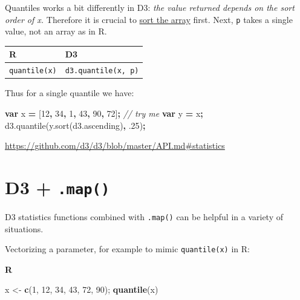 \documentclass[openany]{book}
\newenvironment{Shaded}{\begin{snugshade}}{\end{snugshade}}
\newcommand{\AttributeTok}[1]{\textcolor[rgb]{0.77,0.63,0.00}{#1}}
\newcommand{\CommentTok}[1]{\textcolor[rgb]{0.56,0.35,0.01}{\textit{#1}}}
\newcommand{\DecValTok}[1]{\textcolor[rgb]{0.00,0.00,0.81}{#1}}
\newcommand{\FloatTok}[1]{\textcolor[rgb]{0.00,0.00,0.81}{#1}}
\newcommand{\KeywordTok}[1]{\textcolor[rgb]{0.13,0.29,0.53}{\textbf{#1}}}
\newcommand{\NormalTok}[1]{#1}
\newcommand{\OperatorTok}[1]{\textcolor[rgb]{0.81,0.36,0.00}{\textbf{#1}}}
\newcommand{\StringTok}[1]{\textcolor[rgb]{0.31,0.60,0.02}{#1}}
\newcommand{\VariableTok}[1]{\textcolor[rgb]{0.00,0.00,0.00}{#1}}
\begin{document}
Quantiles works a bit differently in D3: \emph{the value returned depends on the sort order of x.} Therefore it is crucial to \href{just-enough-js.html\#sorting}{sort the array} first. Next, \texttt{p} takes a single value, not an array as in R.

\begin{longtable}[]{@{}ll@{}}
\toprule
R & D3\tabularnewline
\midrule
\endhead
\texttt{quantile(x)} & \texttt{d3.quantile(x,\ p)}\tabularnewline
\bottomrule
\end{longtable}

Thus for a single quantile we have:

\begin{Shaded}
\begin{Highlighting}[]
\KeywordTok{var}\NormalTok{ x }\OperatorTok{=}\NormalTok{ [}\DecValTok{12}\OperatorTok{,} \DecValTok{34}\OperatorTok{,} \DecValTok{1}\OperatorTok{,} \DecValTok{43}\OperatorTok{,} \DecValTok{90}\OperatorTok{,} \DecValTok{72}\NormalTok{]}\OperatorTok{;}      \CommentTok{// try me}
\KeywordTok{var}\NormalTok{ y }\OperatorTok{=}\NormalTok{ x}\OperatorTok{;}
\VariableTok{d3}\NormalTok{.}\AttributeTok{quantile}\NormalTok{(}\VariableTok{y}\NormalTok{.}\AttributeTok{sort}\NormalTok{(}\VariableTok{d3}\NormalTok{.}\AttributeTok{ascending}\NormalTok{)}\OperatorTok{,} \FloatTok{.25}\NormalTok{)}\OperatorTok{;}
\end{Highlighting}
\end{Shaded}

\url{https://github.com/d3/d3/blob/master/API.md\#statistics}

\hypertarget{d3-.map}{%
\section{\texorpdfstring{D3 + \texttt{.map()}}{D3 + .map()}}\label{d3-.map}}

D3 statistics functions combined with \texttt{.map()} can be helpful in a variety of situations.

Vectorizing a parameter, for example to mimic \texttt{quantile(x)} in R:

\textbf{R}

\begin{Shaded}
\begin{Highlighting}[]
\NormalTok{x <-}\StringTok{ }\KeywordTok{c}\NormalTok{(}\DecValTok{1}\NormalTok{, }\DecValTok{12}\NormalTok{, }\DecValTok{34}\NormalTok{, }\DecValTok{43}\NormalTok{, }\DecValTok{72}\NormalTok{, }\DecValTok{90}\NormalTok{);  }
\KeywordTok{quantile}\NormalTok{(x)}
\end{Highlighting}
\end{Shaded}
\end{document}
